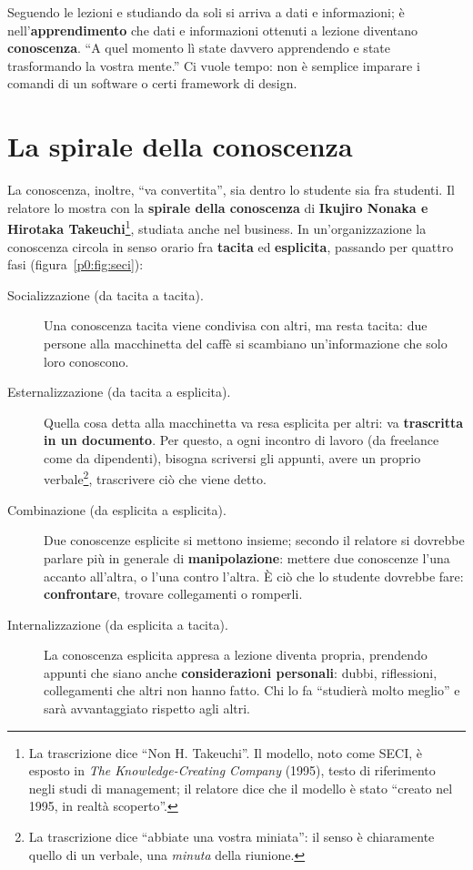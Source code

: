 Seguendo le lezioni e studiando da soli si arriva a dati e informazioni; è
nell'\textbf{apprendimento} che dati e informazioni ottenuti a lezione
diventano \textbf{conoscenza}. ``A quel momento lì state davvero
apprendendo e state trasformando la vostra mente.'' Ci vuole tempo: non è
semplice imparare i comandi di un software o certi framework di design.

\section{La spirale della conoscenza}
\label{p0:sec:spirale}

La conoscenza, inoltre, ``va convertita'', sia dentro lo studente sia fra
studenti. Il relatore lo mostra con la \textbf{spirale della conoscenza} di
\textbf{Ikujiro Nonaka e Hirotaka Takeuchi}\footnote{La trascrizione dice
``Non H. Takeuchi''. Il modello, noto come SECI, è esposto in
\emph{The Knowledge-Creating Company} (1995), testo di riferimento negli
studi di management; il relatore dice che il modello è stato ``creato nel
1995, in realtà scoperto''.}, studiata anche nel business. In
un'organizzazione la conoscenza circola in senso orario fra \textbf{tacita}
ed \textbf{esplicita}, passando per quattro fasi
(figura~\ref{p0:fig:seci}):
\begin{description}
  \item[Socializzazione (da tacita a tacita).] Una conoscenza tacita viene
        condivisa con altri, ma resta tacita: due persone alla macchinetta
        del caffè si scambiano un'informazione che solo loro conoscono.
  \item[Esternalizzazione (da tacita a esplicita).] Quella cosa detta alla
        macchinetta va resa esplicita per altri: va \textbf{trascritta in
        un documento}. Per questo, a ogni incontro di lavoro (da freelance
        come da dipendenti), bisogna scriversi gli appunti, avere un proprio
        verbale\footnote{La trascrizione dice ``abbiate una vostra
        miniata'': il senso è chiaramente quello di un verbale, una
        \emph{minuta} della riunione.}, trascrivere ciò che viene detto.
  \item[Combinazione (da esplicita a esplicita).] Due conoscenze esplicite
        si mettono insieme; secondo il relatore si dovrebbe parlare più in
        generale di \textbf{manipolazione}: mettere due conoscenze l'una
        accanto all'altra, o l'una contro l'altra. È ciò che lo studente
        dovrebbe fare: \textbf{confrontare}, trovare collegamenti o
        romperli.
  \item[Internalizzazione (da esplicita a tacita).] La conoscenza
        esplicita appresa a lezione diventa propria, prendendo appunti che
        siano anche \textbf{considerazioni personali}: dubbi, riflessioni,
        collegamenti che altri non hanno fatto. Chi lo fa ``studierà molto
        meglio'' e sarà avvantaggiato rispetto agli altri.
\end{description}

